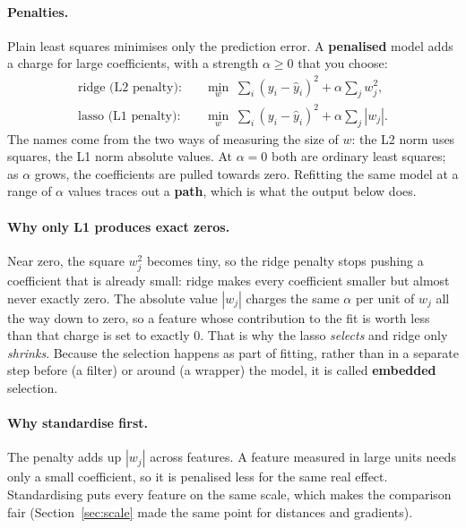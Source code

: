 \documentclass[11pt]{article}
\begin{document}
\paragraph{Penalties.} Plain least squares minimises only the prediction
error. A \textbf{penalised} model adds a charge for large coefficients, with
a strength $\alpha \ge 0$ that you choose:
\begin{align}
  \text{ridge (L2 penalty):}\quad
    & \min_w \; \sum_i (y_i - \hat y_i)^2 + \alpha \sum_j w_j^2 ,
    \label{eq:ridge}\\
  \text{lasso (L1 penalty):}\quad
    & \min_w \; \sum_i (y_i - \hat y_i)^2 + \alpha \sum_j |w_j| .
    \label{eq:lasso}
\end{align}
The names come from the two ways of measuring the size of $w$: the L2 norm
uses squares, the L1 norm absolute values. At $\alpha = 0$ both are ordinary
least squares; as $\alpha$ grows, the coefficients are pulled towards zero.
Refitting the same model at a range of $\alpha$ values traces out a
\textbf{path}, which is what the output below does.

\paragraph{Why only L1 produces exact zeros.} Near zero, the square $w_j^2$
becomes tiny, so the ridge penalty stops pushing a coefficient that is
already small: ridge makes every coefficient smaller but almost never exactly
zero. The absolute value $|w_j|$ charges the same $\alpha$ per unit of
$w_j$ all the way down to zero, so a feature whose contribution to the fit is
worth less than that charge is set to exactly $0$. That is why the lasso
\emph{selects} and ridge only \emph{shrinks}. Because the selection happens
as part of fitting, rather than in a separate step before (a filter) or around
(a wrapper) the model, it is called \textbf{embedded} selection.

\paragraph{Why standardise first.} The penalty adds up $|w_j|$ across
features. A feature measured in large units needs only a small coefficient,
so it is penalised less for the same real effect. Standardising puts every
feature on the same scale, which makes the comparison fair
(Section~\ref{sec:scale} made the same point for distances and
gradients).
\end{document}

